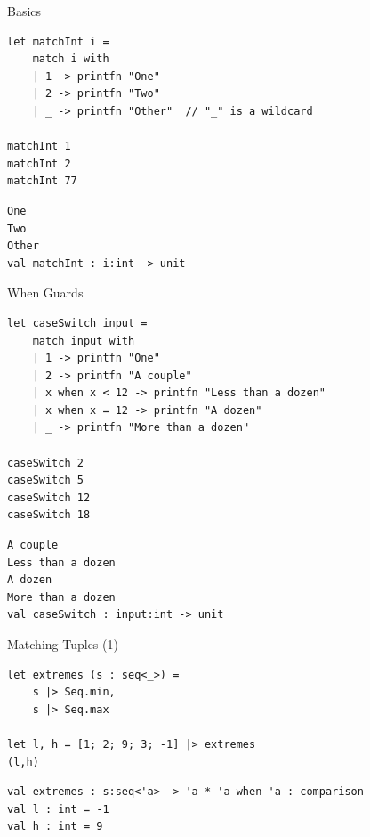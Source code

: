 \documentclass[t]{beamer}
\begin{document}
\begin{frame}[label={sec:org4b7d117},fragile]{Basics}
 \begin{verbatim}
let matchInt i =
    match i with
    | 1 -> printfn "One"
    | 2 -> printfn "Two"
    | _ -> printfn "Other"  // "_" is a wildcard

matchInt 1
matchInt 2
matchInt 77
\end{verbatim}

\begin{verbatim}
One
Two
Other
val matchInt : i:int -> unit
\end{verbatim}
\end{frame}

\begin{frame}[label={sec:orge8906c4},fragile]{When Guards}
 \begin{verbatim}
let caseSwitch input =
    match input with
    | 1 -> printfn "One"
    | 2 -> printfn "A couple"
    | x when x < 12 -> printfn "Less than a dozen" 
    | x when x = 12 -> printfn "A dozen"
    | _ -> printfn "More than a dozen"

caseSwitch 2
caseSwitch 5
caseSwitch 12
caseSwitch 18
\end{verbatim}

\begin{verbatim}
A couple
Less than a dozen
A dozen
More than a dozen
val caseSwitch : input:int -> unit
\end{verbatim}
\end{frame}

\begin{frame}[label={sec:org3d0d70c},fragile]{Matching Tuples (1)}
 \begin{verbatim}
let extremes (s : seq<_>) = 
    s |> Seq.min,
    s |> Seq.max

let l, h = [1; 2; 9; 3; -1] |> extremes
(l,h)
\end{verbatim}

\begin{verbatim}
val extremes : s:seq<'a> -> 'a * 'a when 'a : comparison
val l : int = -1
val h : int = 9
\end{verbatim}
\end{frame}
\end{document}

